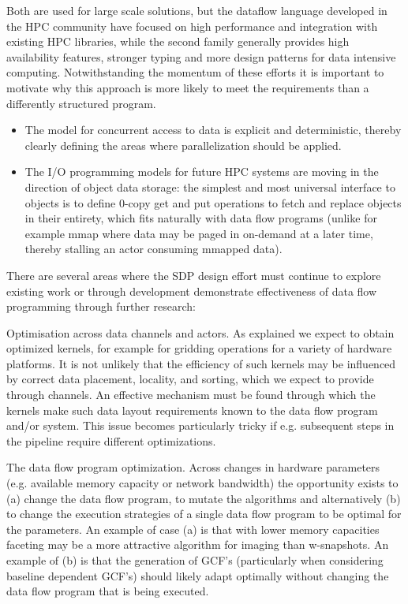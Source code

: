 \documentclass[11pt,a4paper]{article}
\begin{document}
Both are used for large scale solutions, but the dataflow language
developed in the HPC community have focused on high performance and
integration with existing HPC libraries, while the second family
generally provides high availability features, stronger typing and
more design patterns for data intensive computing.  Notwithstanding
the momentum of these efforts it is important to motivate why this
approach is more likely to meet the requirements than a differently
structured program.  
\begin{itemize}
\item The model for concurrent access to data is
explicit and deterministic, thereby clearly defining the areas where
parallelization should be applied.  
\item The I/O programming models for
future HPC systems are moving in the direction of object data storage:
the simplest and most universal interface to objects is to define
0-copy get and put operations to fetch and replace objects in their
entirety, which fits naturally with data flow programs (unlike for
example mmap where data may be paged in on-demand at a later time,
thereby stalling an actor consuming mmapped data).
\end{itemize}


There are several areas where the SDP design effort must continue to
explore existing work or through development demonstrate effectiveness
of data flow programming through further research:

Optimisation across data channels and actors.  As explained we expect
to obtain optimized kernels, for example for gridding operations for a
variety of hardware platforms.  It is not unlikely that the efficiency
of such kernels may be influenced by correct data placement, locality,
and sorting, which we expect to provide through channels.  An
effective mechanism must be found through which the kernels make such
data layout requirements known to the data flow program and/or
system. This issue becomes particularly tricky if e.g. subsequent
steps in the pipeline require different optimizations.

The data flow program optimization.  Across changes in hardware parameters (e.g. available memory capacity or network bandwidth) the opportunity exists to (a) change the data flow program, to mutate the algorithms and alternatively (b) to change the execution strategies of a single data flow program to be optimal for the parameters.  An example of case (a) is that with lower memory capacities faceting may be a more attractive algorithm for imaging than w-snapshots.  An example of (b) is that the generation of GCF’s (particularly when considering baseline dependent GCF’s) should likely adapt optimally without changing the data flow program that is being executed.
\end{document}
